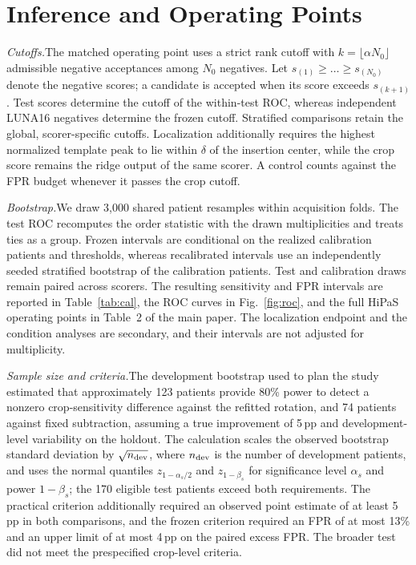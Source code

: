 \section{Inference and Operating Points}
\label{supp:inference}
\smallskip\noindent\textit{Cutoffs.}\enspace The matched operating point uses a strict rank cutoff with $k=\lfloor\alpha N_0\rfloor$ admissible negative acceptances among $N_0$ negatives. Let $s_{(1)}\geq\dots\geq s_{(N_0)}$ denote the negative scores; a candidate is accepted when its score exceeds $s_{(k+1)}$. Test scores determine the cutoff of the within-test ROC, whereas independent LUNA16 negatives determine the frozen cutoff. Stratified comparisons retain the global, scorer-specific cutoffs. Localization additionally requires the highest normalized template peak to lie within $\delta$ of the insertion center, while the crop score remains the ridge output of the same scorer. A control counts against the FPR budget whenever it passes the crop cutoff.

\smallskip\noindent\textit{Bootstrap.}\enspace We draw 3,000 shared patient resamples within acquisition folds. The test ROC recomputes the order statistic with the drawn multiplicities and treats ties as a group. Frozen intervals are conditional on the realized calibration patients and thresholds, whereas recalibrated intervals use an independently seeded stratified bootstrap of the calibration patients. Test and calibration draws remain paired across scorers. The resulting sensitivity and FPR intervals are reported in Table~\ref{tab:cal}, the ROC curves in Fig.~\ref{fig:roc}, and the full HiPaS operating points in Table~2 of the main paper. The localization endpoint and the condition analyses are secondary, and their intervals are not adjusted for multiplicity.

\smallskip\noindent\textit{Sample size and criteria.}\enspace The development bootstrap used to plan the study estimated that approximately 123 patients provide 80\% power to detect a nonzero crop-sensitivity difference against the refitted rotation, and 74 patients against fixed subtraction, assuming a true improvement of 5\,pp and development-level variability on the holdout. The calculation scales the observed bootstrap standard deviation by $\sqrt{n_{\rm dev}}$, where $n_{\rm dev}$ is the number of development patients, and uses the normal quantiles $z_{1-\alpha_s/2}$ and $z_{1-\beta_s}$ for significance level $\alpha_s$ and power $1-\beta_s$; the 170 eligible test patients exceed both requirements. The practical criterion additionally required an observed point estimate of at least 5\,pp in both comparisons, and the frozen criterion required an FPR of at most 13\% and an upper limit of at most 4\,pp on the paired excess FPR. The broader test did not meet the prespecified crop-level criteria.

